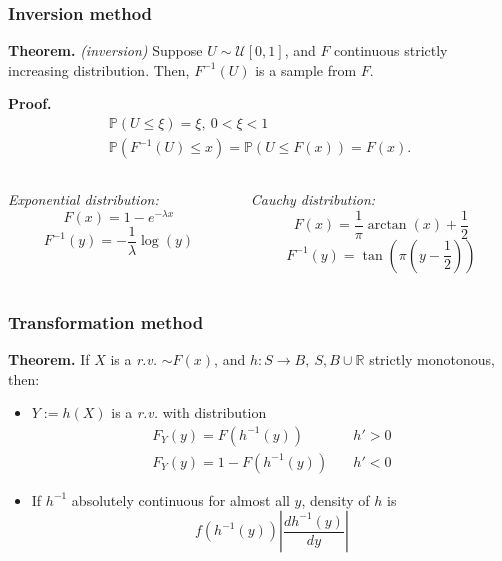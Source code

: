 \documentclass[10pt, serif, mathserif]{beamer}
\begin{document}
\begin{frame}
  \frametitle{Inversion method}
  \textbf{Theorem.} \emph{(inversion)} Suppose $U \sim\mathcal{U}[0,1]$, and $F$ continuous strictly increasing distribution. Then,
    $F^{-1}(U)$ is a sample from $F$.

  \textbf{Proof.} \begin{gather*} 
    \mathbb{P}(U \leq \xi) = \xi,\ 0 < \xi < 1 \\
    \mathbb{P}(F^{-1}(U)\leq x) = \mathbb{P}(U \leq F(x)) = F(x).
  \end{gather*}
  \begin{columns}[t]
    \begin{column}{5cm}
      \centering \emph{Exponential distribution:}
      \[ F(x) = 1 - e^{-\lambda x}\]
      \[ F^{-1}(y) = -\frac{1}{\lambda} \log(y)\]
    \end{column}

    \begin{column}{5cm}
      \centering \emph{Cauchy distribution:}
      \[ F(x) = \frac{1}{\pi} \arctan(x) + \frac{1}{2} \]
      \[ F^{-1}(y) = \tan\left(\pi\left(y - \frac{1}{2}\right)\right)\]
    \end{column}
  \end{columns}
\end{frame}

\begin{frame}
  \frametitle{Transformation method}
  \textbf{Theorem.} If $X$ is a \emph{r.v.} $\sim F(x)$, and $h : S \to B,\ S,B\cup \mathbb{R}$ strictly monotonous, then:
  \medskip
  \begin{itemize}
    \item $Y := h(X)$ is a \emph{r.v.} with distribution
      \begin{align*} 
        F_Y(y) = F(h^{-1}(y)) & \quad h' > 0 \\
        F_Y(y) = 1 - F(h^{-1}(y)) & \quad h' < 0 
      \end{align*}
    \item If $h^{-1}$ absolutely continuous for almost all $y$, density of $h$ is
      \[
        f(h^{-1}(y)) \left| \frac{dh^{-1}(y)}{dy}\right|
      \]
  \end{itemize}
\end{frame}
\end{document}
